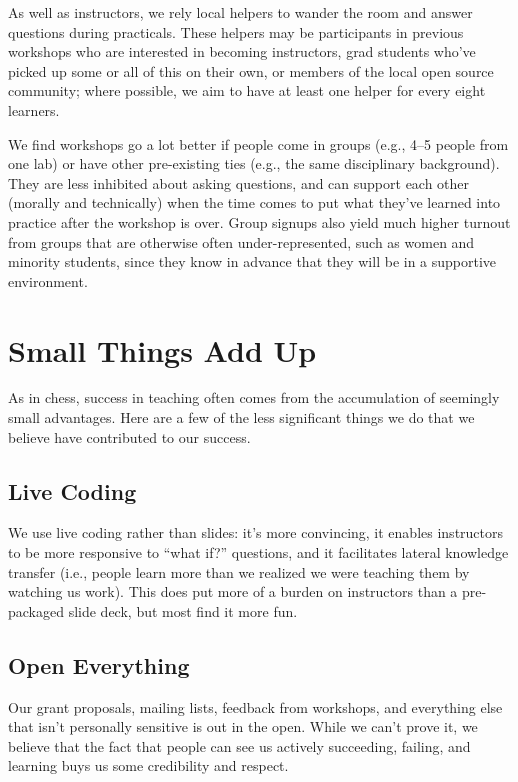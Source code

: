 \documentclass[10pt,a4paper,twocolumn]{article}
\begin{document}
As well as instructors, we rely local helpers to wander the room and
answer questions during practicals. These helpers may be participants in
previous workshops who are interested in becoming instructors, grad
students who've picked up some or all of this on their own, or members
of the local open source community; where possible, we aim to have at
least one helper for every eight learners.

We find workshops go a lot better if people come in groups (e.g., 4--5
people from one lab) or have other pre-existing ties (e.g., the same
disciplinary background). They are less inhibited about asking
questions, and can support each other (morally and technically) when
the time comes to put what they've learned into practice after the
workshop is over. Group signups also yield much higher turnout from
groups that are otherwise often under-represented, such as women and
minority students, since they know in advance that they will be in a
supportive environment.

\section*{Small Things Add Up}

As in chess, success in teaching often comes from the accumulation of
seemingly small advantages. Here are a few of the less significant
things we do that we believe have contributed to our success.

\subsection*{Live Coding}

We use live coding rather than slides: it's more convincing, it enables
instructors to be more responsive to ``what if?'' questions, and it
facilitates lateral knowledge transfer (i.e., people learn more than we
realized we were teaching them by watching us work). This does put more
of a burden on instructors than a pre-packaged slide deck, but most find
it more fun.

\subsection*{Open Everything}

Our grant proposals, mailing lists, feedback from workshops, and
everything else that isn't personally sensitive is out in the open.
While we can't prove it, we believe that the fact that people can see us
actively succeeding, failing, and learning buys us some credibility and
respect.
\end{document}
